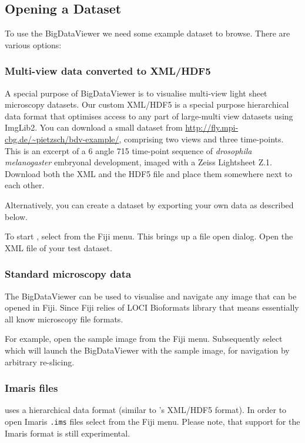 \documentclass{scrartcl}
\begin{document}
\subsection{Opening a Dataset}
To use the BigDataViewer we need some example dataset to browse.
There are various options:

\subsubsection{Multi-view data converted to XML/HDF5}
A special purpose of BigDataViewer is to visualise multi-view light sheet microscopy datasets.
Our custom XML/HDF5  is a special purpose hierarchical data format that optimises access to any part of large-multi view datasets using ImgLib2.
You can download a small dataset from
\url{http://fly.mpi-cbg.de/~pietzsch/bdv-example/}, comprising two views and three time-points.
This is an excerpt of a 6 angle 715 time-point sequence of \emph{drosophila melanogaster} embryonal development, imaged with a Zeiss Lightsheet Z.1.
Download both the XML and the HDF5 file and place them somewhere next to each other.

Alternatively, you can create a dataset by exporting your own data as described below.

To start \bdv, select  from the Fiji menu.
This brings up a file open dialog. Open the XML file of your test dataset.

\subsubsection{Standard microscopy data}
The BigDataViewer can be used to visualise and navigate any image that can be opened in Fiji.
Since Fiji relies of LOCI Bioformats library that means essentially all know microscopy file formats.

For example, open the sample image  from the Fiji menu.
Subsequently select  which will launch the BigDataViewer with the sample image, for navigation by arbitrary re-slicing.

\subsubsection{Imaris files}
\href{http://www.bitplane.com/imaris/imaris}{} uses a hierarchical data format (similar to \bdv's XML/HDF5 format).
In order to open Imaris \texttt{.ims} files select  from the Fiji menu.
Please note, that support for the Imaris format is still experimental.
\end{document}
